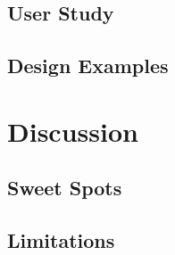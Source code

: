 \subsection{User Study}

\subsection{Design Examples}

\section{Discussion}

\subsection{Sweet Spots}

\subsection{Limitations}